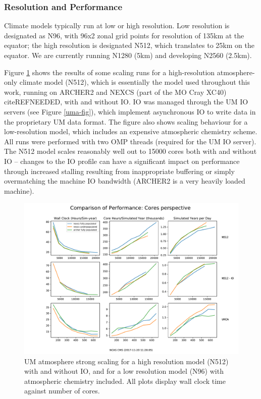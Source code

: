 \documentclass[twocolumn, 12pt]{paper}
\begin{document}
\subsubsection{Resolution and Performance}

Climate models typically run at low or high resolution.
Low resolution is designated as N96, with 96x2 zonal grid points for resolution of 135km at the equator; the high resolution is designated N512, which translates to 25km on the equator.
We are currently running N1280 (5km) and developing N2560 (2.5km).

Figure \ref{scaling-um-fig} shows the results of some scaling runs for a high-resolution atmosphere-only climate model (N512), which is essentially the model used throughout this work, running on ARCHER2 and NEXCS (part of the MO Cray XC40) cite{REFNEEDED}, with and without IO.
IO was managed through the UM IO servers (see Figure \ref{uma-fig}), which implement asynchronous IO to write data in the proprietary UM data format.
The figure also shows scaling behaviour for a low-resolution model, which includes an expensive atmospheric chemistry scheme.
All runs were performed with two OMP threads (required for the UM IO server).
The N512 model scales reasonably well out to 15000 cores both with and without IO -- changes to the IO profile can have a significant impact on performance through increased stalling resulting from inappropriate buffering or simply overmatching the machine IO bandwidth (ARCHER2 is a very heavily loaded machine).


\begin{figure}[H]
	\includegraphics[width=\columnwidth]{figures/Cores.pdf}
	\caption{UM atmosphere strong scaling for a high resolution model (N512) with and without IO, and for a low resolution model (N96) with atmospheric chemistry included. All plots display wall clock time against number of cores.}
	\label{scaling-um-fig}
\end{figure}
\end{document}
